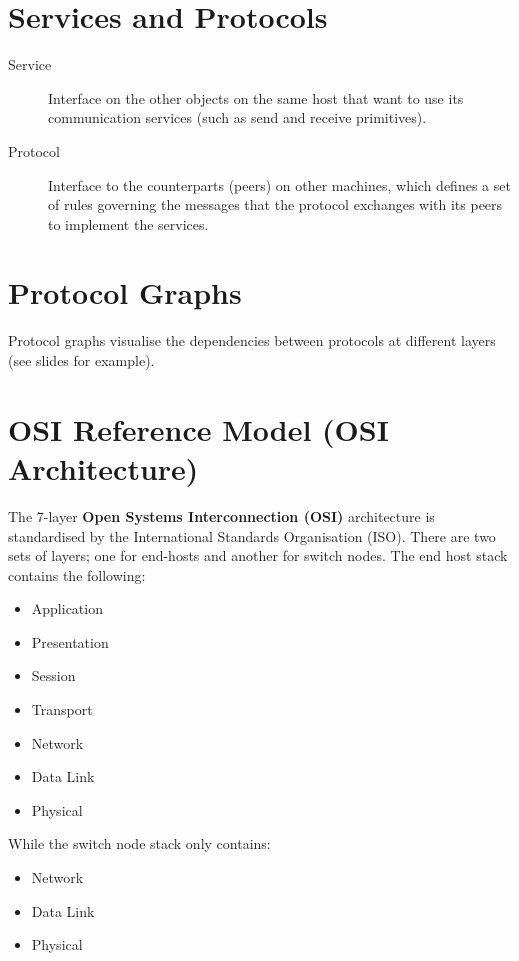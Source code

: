 \documentclass[11pt]{article}
\begin{document}
\section{Services and Protocols}
\label{sec:org6bf551b}
\begin{description}
\item[{Service}] Interface on the other objects on the same host that want to use its communication services (such as send and receive primitives).
\item[{Protocol}] Interface to the counterparts (peers) on other machines, which defines a set of rules governing the messages that the protocol exchanges with its peers to implement the services.
\end{description}

\section{Protocol Graphs}
\label{sec:org2f7025e}
Protocol graphs visualise the dependencies between protocols at different layers (see slides for example).

\section{OSI Reference Model (OSI Architecture)}
\label{sec:orge552cb3}
The 7-layer \textbf{Open Systems Interconnection (OSI)} architecture is standardised by the International Standards Organisation (ISO).
There are two sets of layers; one for end-hosts and another for switch nodes.
The end host stack contains the following:
\begin{itemize}
\item Application
\item Presentation
\item Session
\item Transport
\item Network
\item Data Link
\item Physical
\end{itemize}
While the switch node stack only contains:
\begin{itemize}
\item Network
\item Data Link
\item Physical
\end{itemize}
\end{document}
